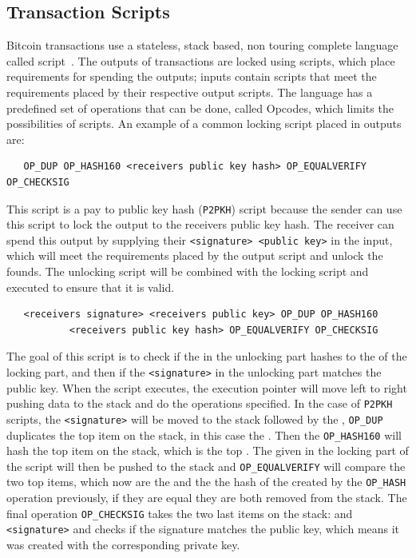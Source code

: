 \subsection{Transaction Scripts}
\label{subsec:scripts}

Bitcoin transactions use a stateless, stack based, non touring complete language called script~\cite{antonopoulos2017mastering}.
The outputs of transactions are locked using scripts, which place requirements for spending the outputs; inputs contain scripts that meet the requirements placed by their respective output scripts. The language has a predefined set of operations that can be done, called Opcodes, which limits the possibilities of scripts. 
An example of a common locking script placed in outputs are: 

\begin{verbatim}
   OP_DUP OP_HASH160 <receivers public key hash> OP_EQUALVERIFY OP_CHECKSIG
\end{verbatim}


This script is a pay to public key hash ({\tt P2PKH}) script because the sender can use this script to lock the output to the receivers public key hash. The receiver can spend this output by supplying their {\tt<signature> <public key>} in the input, which will meet the requirements placed by the output script and unlock the founds. The unlocking script will be combined with the locking script and executed to ensure that it is valid. 

\begin{verbatim}
   <receivers signature> <receivers public key> OP_DUP OP_HASH160 
           <receivers public key hash> OP_EQUALVERIFY OP_CHECKSIG
\end{verbatim}

The goal of this script is to check if the {\tt <public key>} in the unlocking part hashes to the {\tt  <public key hash>} of the locking part, and then if the {\tt <signature>} in the unlocking part matches the public key.
When the script executes, the execution pointer will move left to right pushing data to the stack and do the operations specified.
In the case of {\tt P2PKH} scripts, the {\tt <signature>} will be moved to the stack followed by the {\tt <public key>}, {\tt OP\_DUP} duplicates the top item on the stack, in this case the {\tt <public key>}. Then the {\tt OP\_HASH160} will hash the top item on the stack, which is the top {\tt <public key>}. The {\tt <public key hash>} given in the locking part of the script will then be pushed to the stack and {\tt OP\_EQUALVERIFY} will compare the two top items, which now are the {\tt <public key hash>} and the the hash of the {\tt <public key>} created by the {\tt OP\_HASH} operation previously, if they are equal they are both removed from the stack. The final operation {\tt OP\_CHECKSIG} takes the two last items on the stack: {\tt <public key>} and {\tt <signature>} and checks if the signature matches the public key, which means it was created with the corresponding private key.
\\

